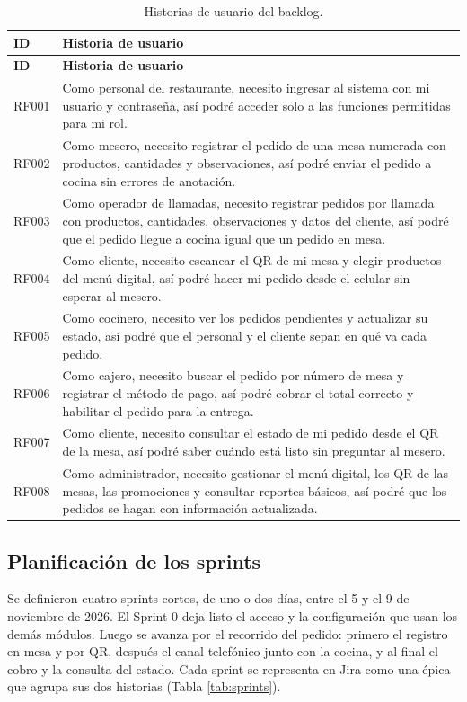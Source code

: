 \documentclass[a4paper, 11pt]{article}
\begin{document}
{\small
\begin{longtable}{|p{1.2cm}|p{12.5cm}|}
\caption{Historias de usuario del backlog.}\label{tab:hu}\\
\hline
\textbf{ID} & \textbf{Historia de usuario} \\ \hline
\endfirsthead
\hline
\textbf{ID} & \textbf{Historia de usuario} \\ \hline
\endhead
RF001 & Como personal del restaurante, necesito ingresar al sistema con mi usuario y contraseña, así podré acceder solo a las funciones permitidas para mi rol. \\ \hline
RF002 & Como mesero, necesito registrar el pedido de una mesa numerada con productos, cantidades y observaciones, así podré enviar el pedido a cocina sin errores de anotación. \\ \hline
RF003 & Como operador de llamadas, necesito registrar pedidos por llamada con productos, cantidades, observaciones y datos del cliente, así podré que el pedido llegue a cocina igual que un pedido en mesa. \\ \hline
RF004 & Como cliente, necesito escanear el QR de mi mesa y elegir productos del menú digital, así podré hacer mi pedido desde el celular sin esperar al mesero. \\ \hline
RF005 & Como cocinero, necesito ver los pedidos pendientes y actualizar su estado, así podré que el personal y el cliente sepan en qué va cada pedido. \\ \hline
RF006 & Como cajero, necesito buscar el pedido por número de mesa y registrar el método de pago, así podré cobrar el total correcto y habilitar el pedido para la entrega. \\ \hline
RF007 & Como cliente, necesito consultar el estado de mi pedido desde el QR de la mesa, así podré saber cuándo está listo sin preguntar al mesero. \\ \hline
RF008 & Como administrador, necesito gestionar el menú digital, los QR de las mesas, las promociones y consultar reportes básicos, así podré que los pedidos se hagan con información actualizada. \\ \hline
\end{longtable}
}

\subsection{Planificación de los sprints}

Se definieron cuatro sprints cortos, de uno o dos días, entre el 5 y el 9 de noviembre de 2026. El Sprint 0 deja listo el acceso y la configuración que usan los demás módulos. Luego se avanza por el recorrido del pedido: primero el registro en mesa y por QR, después el canal telefónico junto con la cocina, y al final el cobro y la consulta del estado. Cada sprint se representa en Jira como una épica que agrupa sus dos historias (Tabla \ref{tab:sprints}).
\end{document}
